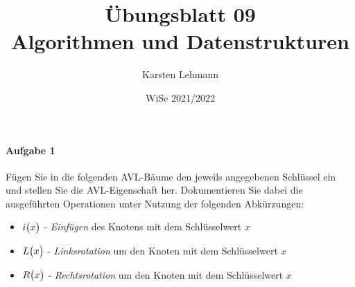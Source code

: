 \documentclass{scrreprt}
\author{Karsten Lehmann}
\date{WiSe 2021/2022}
\title{Übungsblatt 09\\Algorithmen und Datenstrukturen}
\begin{document}
\paragraph{Aufgabe 1}
Fügen Sie in die folgenden AVL-Bäume den jeweils angegebenen Schlüssel ein und
stellen Sie die AVL-Eigenschaft her.
Dokumentieren Sie dabei die ausgeführten Operationen unter Nutzung der folgenden
Abkürzungen:
\begin{itemize}
\item $i\qty\big(x)$ - \emph{Einfügen} des Knotens mit dem Schlüsselwert $x$
\item $L\qty\big(x)$ - \emph{Linksrotation} um den Knoten mit dem Schlüsselwert $x$
\item $R\qty\big(x)$ - \emph{Rechtsrotation} um den Knoten mit dem Schlüsselwert $x$
\end{itemize}
\end{document}
